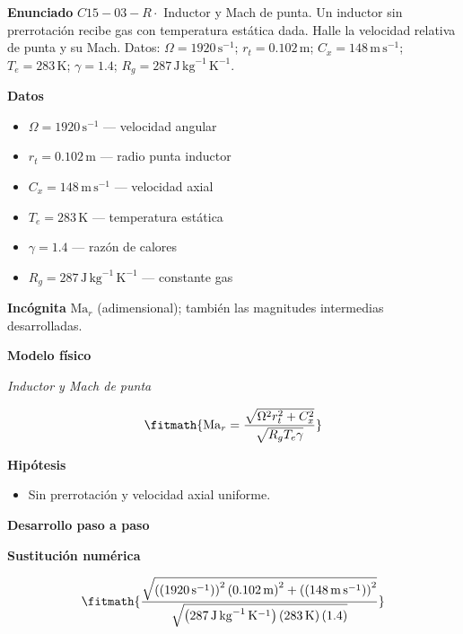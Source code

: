 \documentclass[10pt,openany]{book}
\begin{document}
\begin{tcolorbox}[title={Problema resuelto 3}, studiumworked, breakable]

\noindent\textbf{Enunciado}
\(C15-03-R \cdot\) Inductor y Mach de punta. Un inductor sin prerrotación recibe gas con temperatura estática dada. Halle la velocidad relativa de punta y su Mach. Datos: \(\Omega=1920\, \mathrm{s}^{-1}\); \(r_t=0.102\, \mathrm{m}\); \(C_x=148\, \mathrm{m}\,\mathrm{s}^{-1}\); \(T_e=283\, \mathrm{K}\); \(\gamma=1.4\); \(R_g=287\, \mathrm{J}\,\mathrm{kg}^{-1}\,\mathrm{K}^{-1}\).

\noindent\textbf{Datos}
\begin{itemize}
\item $\Omega = 1920\,\mathrm{s}^{-1}$ — velocidad angular
\item $r_t = 0.102\,\mathrm{m}$ — radio punta inductor
\item $C_x = 148\,\mathrm{m}\,\mathrm{s}^{-1}$ — velocidad axial
\item $T_e = 283\,\mathrm{K}$ — temperatura estática
\item $\gamma = 1.4$ — razón de calores
\item $R_g = 287\,\mathrm{J}\,\mathrm{kg}^{-1}\,\mathrm{K}^{-1}$ — constante gas
\end{itemize}

\noindent\textbf{Incógnita}
$\mathrm{Ma}_r$ (adimensional); también las magnitudes intermedias desarrolladas.

\noindent\textbf{Modelo físico}

\noindent\textit{Inductor y Mach de punta}

\[
\fitmath{\mathrm{Ma}_r=\frac{\sqrt{\Omega^{2} r_t^{2} + C_x^{2}}}{\sqrt{R_g T_e \gamma}}}
\]

\noindent\textbf{Hipótesis}
\begin{itemize}
\item Sin prerrotación y velocidad axial uniforme.
\end{itemize}

\noindent\textbf{Desarrollo paso a paso}



\noindent\textbf{Sustitución numérica}

\[
\fitmath{\frac{\sqrt{\left(\left(1920\,\mathrm{s}^{-1}\right)\right)^{2} \left(0.102\,\mathrm{m}\right)^{2} + \left(\left(148\,\mathrm{m}\,\mathrm{s}^{-1}\right)\right)^{2}}}{\sqrt{\left(287\,\mathrm{J}\,\mathrm{kg}^{-1}\,\mathrm{K}^{-1}\right) \left(283\,\mathrm{K}\right) \left(1.4\right)}}}
\]


\end{tcolorbox}
\end{document}
